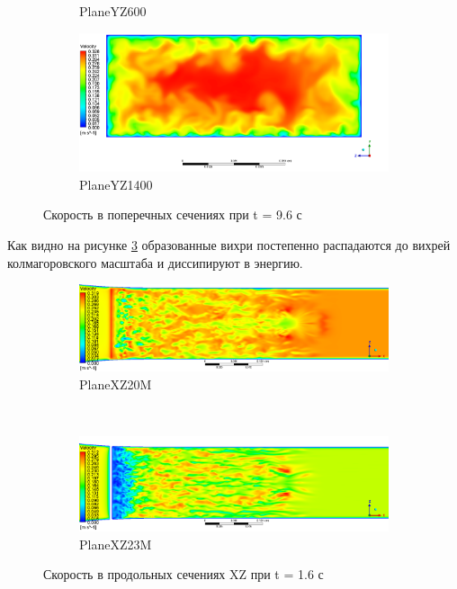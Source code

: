 \begin{figure}[H]
\begin{subfigure}{.5\textwidth}
			\caption{PlaneYZ600}
			\label{fig:T96VelocityContourYZ600}
		\end{subfigure}%
		\begin{subfigure}{.5\textwidth}
			\centering
			\includegraphics[width=1.1\linewidth]{../Assets/T96_Velocity_ContourYZ1400}
			\caption{PlaneYZ1400}
			\label{fig:T96VelocityContourYZ1400}
		\end{subfigure}
		\caption{Скорость в поперечных сечениях при t = 9.6 с}
		\label{fig:T96VelocityContourYZ}
	\end{figure}
	Как видно на рисунке \ref{fig:T96VelocityContourYZ} образованные вихри постепенно распадаются до вихрей колмагоровского масштаба и диссипируют в энергию.
	
	\begin{figure}[H]
		\begin{subfigure}{1\textwidth}
			\centering
			\includegraphics[width=1\linewidth]{../Assets/T16_Velocity_ContourXZ20M}
			\caption{PlaneXZ20M}
			\label{fig:T16VelocityContourXZ20M}
		\end{subfigure}%
		\\
		\begin{subfigure}{1\textwidth}
			\centering
			\includegraphics[width=1\linewidth]{../Assets/T16_Velocity_ContourXZ23M}
			\caption{PlaneXZ23M}
			\label{fig:T16VelocityContourXZ23M}
		\end{subfigure}
	 	\caption{Скорость в продольных сечениях XZ при t = 1.6 с}
	 	\label{fig:T16VelocityContourXZ}
	\end{figure}

